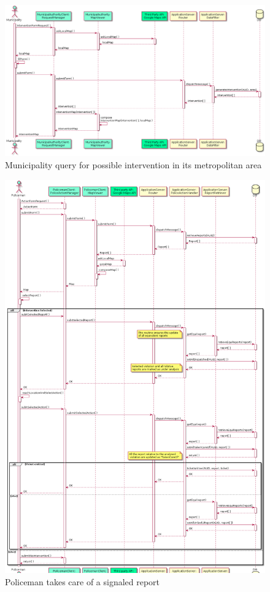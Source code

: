 \begin{figure}[H]
	\centering
	\includegraphics[width=\textwidth]{Images/seqDiag_Interventions}
	\caption{Municipality query for possible intervention in its metropolitan area}
\end{figure}
	\newpage

\begin{figure}[H]
	\centering
	\includegraphics[width=\textwidth]{Images/seqDiag_PolicemanAct}
	\caption{Policeman takes care of a signaled report}
\end{figure}


